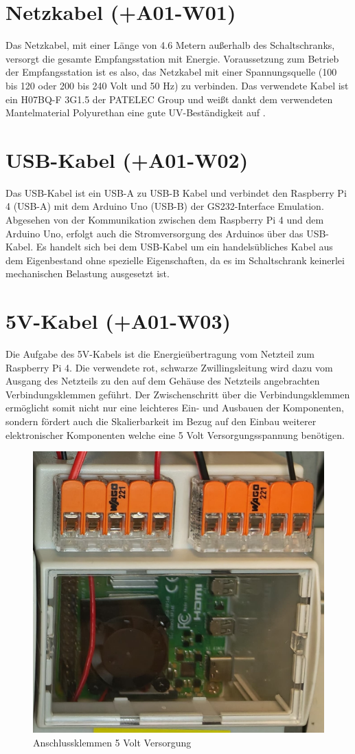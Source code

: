 \section{Netzkabel (+A01-W01)}
Das Netzkabel, mit einer Länge von 4.6 Metern außerhalb des Schaltschranks, versorgt die gesamte Empfangsstation mit Energie. Voraussetzung zum Betrieb der Empfangsstation ist es also, das Netzkabel mit einer Spannungsquelle (100 bis 120 oder 200 bis 240 Volt und 50 Hz) zu verbinden. Das verwendete Kabel ist ein H07BQ-F 3G1.5 der PATELEC Group \cite{noauthor_cables_nodate} und weißt dankt dem verwendeten Mantelmaterial Polyurethan eine gute UV-Beständigkeit auf \cite{noauthor_polyurethan_nodate}.

\section{USB-Kabel (+A01-W02)}
Das USB-Kabel ist ein USB-A zu USB-B Kabel und verbindet den Raspberry Pi 4 (USB-A) mit dem Arduino Uno (USB-B) der GS232-Interface Emulation. Abgesehen von der Kommunikation zwischen dem Raspberry Pi 4 und dem Arduino Uno, erfolgt auch die Stromversorgung des Arduinos über das USB-Kabel. Es handelt sich bei dem USB-Kabel um ein handelsübliches Kabel aus dem Eigenbestand ohne spezielle Eigenschaften, da es im Schaltschrank keinerlei mechanischen Belastung ausgesetzt ist.

\section{5V-Kabel (+A01-W03)}
Die Aufgabe des 5V-Kabels ist die Energieübertragung vom Netzteil zum Raspberry Pi 4. Die verwendete rot, schwarze Zwillingsleitung wird dazu vom Ausgang des Netzteils zu den auf dem Gehäuse des Netzteils angebrachten Verbindungsklemmen geführt. Der Zwischenschritt über die Verbindungsklemmen ermöglicht somit nicht nur eine leichteres Ein- und Ausbauen der Komponenten, sondern fördert auch die Skalierbarkeit im Bezug auf den Einbau weiterer elektronischer Komponenten welche eine 5 Volt Versorgungsspannung benötigen.

\begin{figure}[H]
	\centering
	\includegraphics[width=.25\linewidth]{../ref/Anschlussklemmen5V.jpeg}
	\caption{Anschlussklemmen 5 Volt Versorgung}
	\label{fig:anschlussklemmen}
\end{figure}

